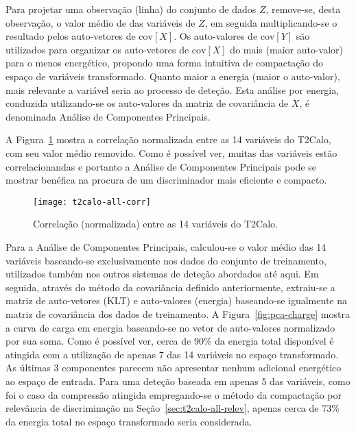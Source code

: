 Para projetar uma observação (linha) do conjunto de dados $Z$, remove-se,
desta observação, o valor médio de das variáveis de $Z$, em seguida
multiplicando-se o resultado pelos auto-vetores de $\text{cov}[X]$. Os
auto-valores de $\text{cov}[Y]$ são utilizados para organizar os auto-vetores
de $\text{cov}[X]$ do mais (maior auto-valor) para o menos energético,
propondo uma forma intuitiva de compactação do espaço de variáveis
transformado. Quanto maior a energia (maior o auto-valor), mais relevante a
variável seria ao processo de deteção. Esta análise por energia, conduzida
utilizando-se os auto-valores da matriz de covariância de $X$, é denominada
Análise de Componentes Principais.

A Figura~\ref{fig:t2calo-correl} mostra a correlação normalizada entre as 14
variáveis do T2Calo, com seu valor médio removido. Como é possível ver, muitas
das variáveis estão correlacionandas e portanto a Análise de Componentes
Principais pode se mostrar benéfica na procura de um discriminador mais
eficiente e compacto.

\begin{figure}
\begin{center}
\texttt{[image: t2calo-all-corr]}
\end{center}
\caption{Correlação (normalizada) entre as 14 variáveis do T2Calo.}
\label{fig:t2calo-correl}
\end{figure}

Para a Análise de Componentes Principais, calculou-se o valor médio das 14
variáveis baseando-se exclusivamente nos dados do conjunto de treinamento,
utilizados também nos outros sistemas de deteção abordados até aqui. Em
seguida, através do método da covariância definido anteriormente, extraiu-se a
matriz de auto-vetores (KLT) e auto-valores (energia) baseando-se igualmente
na matriz de covariância dos dados de treinamento. A
Figura~\ref{fig:pca-charge} mostra a curva de carga em energia baseando-se no
vetor de auto-valores normalizado por sua soma. Como é possível ver, cerca de
90\% da energia total disponível é atingida com a utilização de apenas 7 das
14 variáveis no espaço transformado. As últimas 3 componentes parecem não
apresentar nenhum adicional energético ao espaço de entrada. Para uma deteção
baseada em apenas 5 das variáveis, como foi o caso da compressão atingida
empregando-se o método da compactação por relevância de discriminação na
Seção~\ref{sec:t2calo-all-relev}, apenas cerca de 73\% da energia total no
espaço transformado seria considerada.

